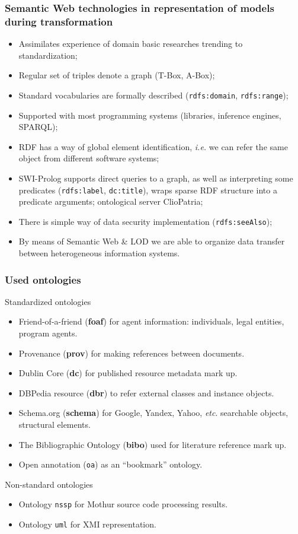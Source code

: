 \documentclass[10pt]{beamer}
\begin{document}
\begin{frame}[fragile]
  \frametitle{Semantic Web technologies in representation of models
    during transformation}
  \begin{itemize}
  \item Assimilates experience of domain basic researches trending to standardization;
  \item Regular set of triples denote a graph (T-Box, A-Box);
  \item Standard vocabularies are formally described (\verb|rdfs:domain|, \verb|rdfs:range|);
  \item Supported with most programming systems (libraries, inference engines, SPARQL);
  \item RDF has a way of global element identification, \emph{i.e.} we can refer the same object from different software systems;
  \item SWI-Prolog supports direct queries to a graph, as well as interpreting some predicates (\verb|rdfs:label|, \verb|dc:title|), wraps sparse RDF structure into a predicate arguments; ontological server ClioPatria;
  \item There is simple way of data security implementation (\verb|rdfs:seeAlso|);
  \item By means of Semantic Web \& LOD we are able to organize data transfer between heterogeneous information systems.
  \end{itemize}
\end{frame}

\begin{frame}
  \frametitle{Used ontologies}

  Standardized ontologies

  \begin{itemize}
  \item Friend-of-a-friend (\textbf{foaf}) for agent information: individuals, legal entities, program agents.
  \item Provenance (\textbf{prov}) for making references between documents.
  \item Dublin Core (\textbf{dc}) for published resource metadata mark up.
  \item DBPedia resource (\textbf{dbr}) to refer external classes and instance objects.
  \item Schema.org (\textbf{schema}) for Google, Yandex, Yahoo, \emph{etc}. searchable objects, structural elements.
  \item The Bibliographic Ontology (\textbf{bibo}) used for literature reference mark up.
  \item Open annotation (\texttt{oa}) as an ``bookmark'' ontology.
  \end{itemize}

  Non-standard ontologies

  \begin{itemize}
  \item Ontology \texttt{nssp} for Mothur source code processing results.
  \item Ontology \texttt{uml} for XMI representation.
  \end{itemize}
\end{frame}
\end{document}
